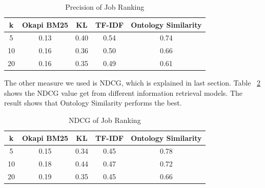 \begin{table}[ht]
\caption{Precision of Job Ranking } %
\centering %
\begin{tabular}{    | c | c | c | c | c |  }
 \hline
       k     & Okapi BM25 & KL    & TF-IDF   & Ontology Similarity  \\
 \hline
       5     & 0.13       & 0.40  & 0.54     & 0.74   \\
 \hline
       10    & 0.16       & 0.36  & 0.50     & 0.66   \\
 \hline
       20    & 0.16       & 0.35  & 0.49     & 0.61   \\
 \hline

\end{tabular}
\label{tab:job_precision} %
\end{table}

The other measure we used is NDCG, which is explained in last section. Table ~\ref{tab:job_ndcg} shows the NDCG value get from different information retrieval models. The result shows that Ontology Similarity  performs the best.

\begin{table}[ht]
\caption{NDCG of Job Ranking } %
\centering %
\begin{tabular}{    | c | c | c | c | c |  }
 \hline
       k    & Okapi BM25 & KL    & TF-IDF & Ontology Similarity  \\
 \hline
       5    & 0.15       & 0.34  & 0.45     & 0.78   \\
 \hline
       10   & 0.18       & 0.44  & 0.47     & 0.72   \\
 \hline
       20   & 0.19       & 0.35  & 0.45     & 0.66   \\
 \hline

\end{tabular}
\label{tab:job_ndcg} %
\end{table}

